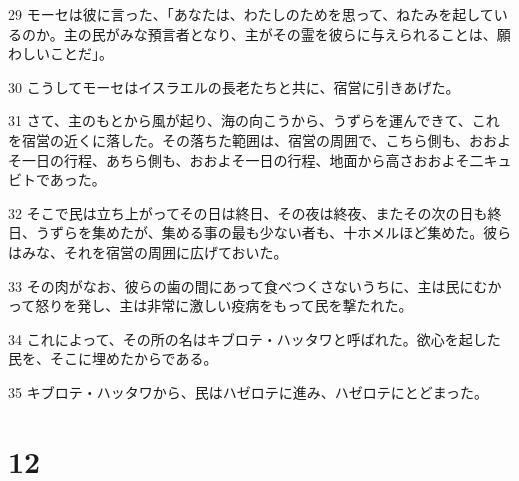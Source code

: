 \par 29 モーセは彼に言った、「あなたは、わたしのためを思って、ねたみを起しているのか。主の民がみな預言者となり、主がその霊を彼らに与えられることは、願わしいことだ」。
\par 30 こうしてモーセはイスラエルの長老たちと共に、宿営に引きあげた。
\par 31 さて、主のもとから風が起り、海の向こうから、うずらを運んできて、これを宿営の近くに落した。その落ちた範囲は、宿営の周囲で、こちら側も、おおよそ一日の行程、あちら側も、おおよそ一日の行程、地面から高さおおよそ二キュビトであった。
\par 32 そこで民は立ち上がってその日は終日、その夜は終夜、またその次の日も終日、うずらを集めたが、集める事の最も少ない者も、十ホメルほど集めた。彼らはみな、それを宿営の周囲に広げておいた。
\par 33 その肉がなお、彼らの歯の間にあって食べつくさないうちに、主は民にむかって怒りを発し、主は非常に激しい疫病をもって民を撃たれた。
\par 34 これによって、その所の名はキブロテ・ハッタワと呼ばれた。欲心を起した民を、そこに埋めたからである。
\par 35 キブロテ・ハッタワから、民はハゼロテに進み、ハゼロテにとどまった。

\chapter{12}


